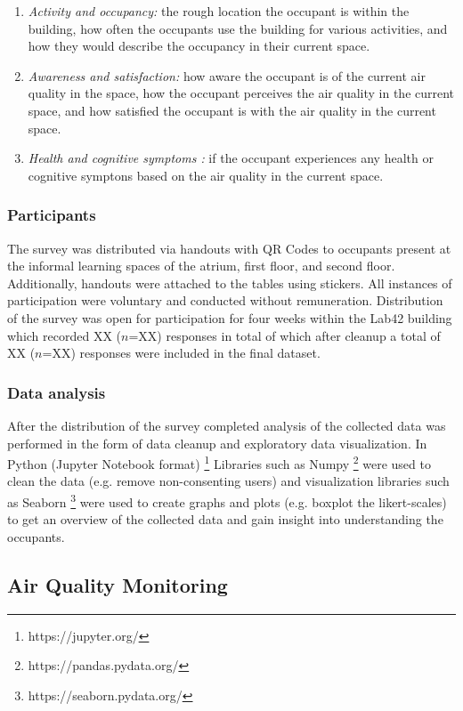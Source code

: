 \begin{enumerate}
  \item \textit{Activity and occupancy:} the rough location the occupant is within the building, how often the occupants use the building for various activities, and how they would describe the occupancy in their current space.
  \item \textit{Awareness and satisfaction:} how aware the occupant is of the current air quality in the space, how the occupant perceives the air quality in the current space, and how satisfied the occupant is with the air quality in the current space.
  \item \textit{Health and cognitive symptoms :} if the occupant experiences any health or cognitive symptons based on the air quality in the current space.
\end{enumerate}


\subsubsection{Participants}
The survey was distributed via handouts with QR Codes to occupants present at the informal learning spaces of the atrium, first floor, and second floor. Additionally, handouts were attached to the tables using stickers. All instances of participation were voluntary and conducted without remuneration. Distribution of the survey was open for participation for four weeks within the Lab42 building which recorded XX ($n$=XX) responses in total of which after cleanup a total of XX ($n$=XX) responses were included in the final dataset.

\subsubsection{Data analysis}
\label{sec:analysis}
After the distribution of the survey completed analysis of the collected data was performed in the form of data cleanup and exploratory data visualization. In Python (Jupyter Notebook format) \footnote{https://jupyter.org/} Libraries such as Numpy \footnote{https://pandas.pydata.org/} were used to clean the data (e.g. remove non-consenting users) and visualization libraries such as Seaborn \footnote{https://seaborn.pydata.org/} were used to create graphs and plots (e.g. boxplot the likert-scales) to get an overview of the collected data and gain insight into understanding the occupants.

\subsection{Air Quality Monitoring}

